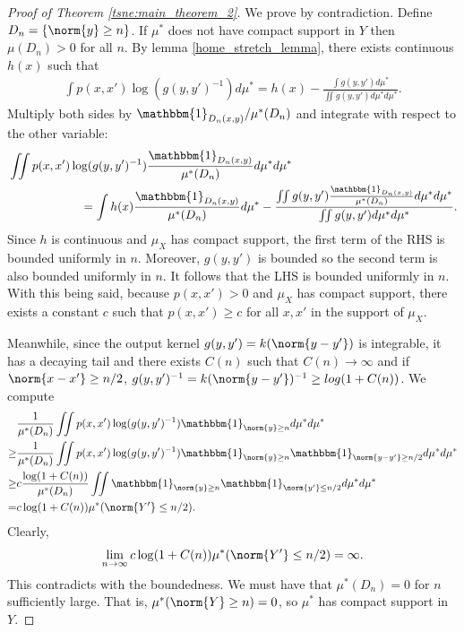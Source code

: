 \begin{proof}[Proof of Theorem \ref{tsne:main_theorem_2}] \label{tsne:sec:main_theorem_2}
    We prove by contradiction. Define $D_n = \{\norm{y} \geq n\}$. If $\mu^*$ does not have compact support in $Y$ then $\mu(D_n)>0$ for all $n$. By lemma \ref{home_stretch_lemma}, there exists continuous $h(x)$ such that
    \begin{align}
        \int p(x,x') \log(g(y,y')^{-1})d\mu^* = h(x) -  \frac{\int g(y,y')d\mu^*}{\iint g(y,y')d\mu^* d\mu^*}.
    \end{align}
    Multiply both sides by $\mathbbm{1}_{D_n(x,y)}/\mu^*(D_n)$ and integrate with respect to the other variable:
    \begin{align}
         & \iint p(x,x') \log(g(y,y')^{-1}) \frac{\mathbbm{1}_{D_n(x,y)}}{\mu^*(D_n)}d\mu^* d\mu^* \nonumber                                                                                          \\
         & \qquad \qquad \qquad= \int h(x)\frac{\mathbbm{1}_{D_n(x,y)}}{\mu^*(D_n)}d\mu^* -  \frac{\iint g(y,y')\frac{\mathbbm{1}_{D_n(x,y)}}{\mu^*(D_n)} d\mu^* d\mu^*}{\iint g(y,y')d\mu^* d\mu^*}.
    \end{align}
    Since $h$ is continuous and $\mu_X$ has compact support, the first term of the RHS is bounded uniformly in $n$. Moreover, $g(y,y')$  is bounded so the second term is also bounded uniformly in $n$. It follows that the LHS is bounded uniformly in $n$. With this being said, because $p(x,x')>0$ and $\mu_X$ has compact support, there exists a constant $c$ such that $p(x,x') \geq c$ for all $x,x'$ in the support of $\mu_X$.

    Meanwhile, since the output kernel $g(y,y') = k(\norm{y-y'})$ is integrable, it
    has a decaying tail and there exists $C(n)$ such that $C(n) \to \infty$ and if
    $\norm{x-x'} \geq n/2$, $g(y,y')^{-1}=k(\norm{y-y'})^{-1} \geq log (1+C(n))$.
    We compute
    \begin{align}
             & \frac{1}{\mu^*(D_n)} \iint p(x,x') \log(g(y,y')^{-1}) \mathbbm{1}_{\norm{y} \geq n} d\mu^* d\mu^* \nonumber                                   \\
        \geq & \frac{1}{\mu^*(D_n)} \iint p(x,x') \log(g(y,y')^{-1}) \mathbbm{1}_{\norm{y} \geq n} \mathbbm{1}_{\norm{y-y'} \geq n/2}d\mu^* d\mu^* \nonumber \\
        \geq & c \frac{\log(1+C(n))}{\mu^*(D_n)} \iint \mathbbm{1}_{\norm{y} \geq n} \mathbbm{1}_{\norm{y'} \leq n/2}d\mu^* d\mu^* \nonumber                 \\
        =    & c\log(1+C(n)) \mu^*(\norm{Y'}\leq n/2).
    \end{align}
    Clearly,
    \begin{align}
        \lim_{n \to \infty} c\log(1+C(n)) \mu^*(\norm{Y'}\leq n/2) = \infty.
    \end{align}
    This contradicts with the boundedness. We must have that $\mu^*(D_n)=0$ for $n$ sufficiently large. That is, $\mu^*(\norm{Y} \geq n)=0$, so $\mu^*$ has compact support in $Y$.
\end{proof}